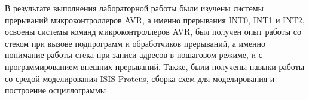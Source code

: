 \documentclass{bmstu}
\makeatletter
\renewcommand\chapter{\par%
\thispagestyle{plain}%
\@afterindentfalse \secdef\@chapter\@schapter}
\makeatother
\begin{document}
\chapter{Вывод:}
В результате выполнения лабораторной работы были изучены
системы прерываний микроконтроллеров AVR, а именно прерывания INT0,
INT1 и INT2, освоены системы команд микроконтроллеров AVR, был
получен опыт работы со стеком при вызове подпрограмм и обработчиков
прерываний, а именно понимание работы стека при записи адресов в
пошаговом режиме, и с программированием внешних прерываний. Также,
были получены навыки работы со средой моделирования ISIS Proteus, сборка
схем для моделирования и построение осциллограммы
\end{document}
